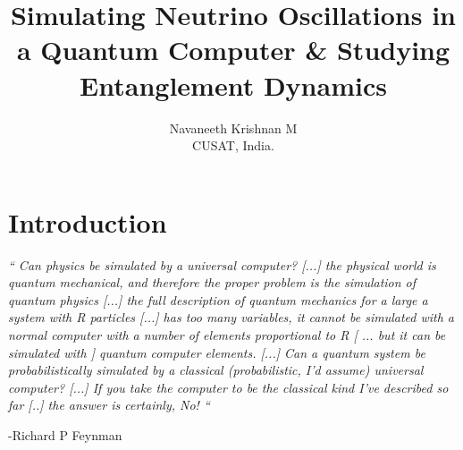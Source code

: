 \documentclass[12pt,a4paper]{report}
\title{
	\Large Simulating Neutrino Oscillations in a Quantum Computer
	\& Studying Entanglement Dynamics}
\author{\large Navaneeth Krishnan M\\
	\small CUSAT, India.}
\begin{document}
\maketitle
\pagebreak	
\tableofcontents

\listoffigures

\chapter*{Introduction}
\emph{“ Can physics be simulated by a universal computer? [...] the physical world is quantum mechanical, and therefore the proper problem is the simulation of quantum physics [...] the full description of quantum mechanics for a large a system with R particles [...] has too many variables, it cannot be simulated with a normal computer with a number of elements proportional to R [ ... but it can be simulated with ] quantum computer elements. [...] Can a quantum system be probabilistically simulated by a classical (probabilistic, I’d assume) universal computer? [...] If you take the computer to be the classical kind I’ve described so far [..] the answer is certainly, No! “} 
\begin{flushright}
-Richard P Feynman \cite{feynman82}\cite{nielsen}
\end{flushright}
\end{document}
